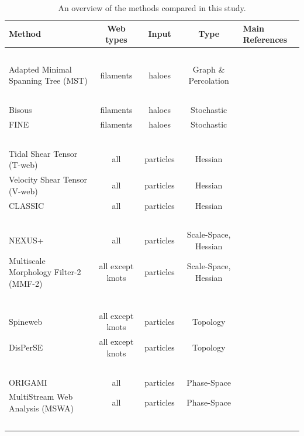 \begin{table}
 \caption{An overview of the methods compared in this study.}
 \begin{tabular}{@{}lcccl}
  \hline\hline
  Method & Web types & Input & Type & Main References \\
  \hline
\ \\
  Adapted Minimal Spanning Tree (MST) & filaments & haloes & Graph \& Percolation & \citet{Alpaslan2014} \\
\ \\
  Bisous  & filaments & haloes & Stochastic & \citet{Tempel2014} \\
  FINE  & filaments & haloes & Stochastic & \citet{Gonzalez2010} \\
\ \\
  Tidal Shear Tensor (T-web) & all & particles & Hessian & \citet{Forero-Romero2009a} \\
  Velocity Shear Tensor (V-web) & all & particles & Hessian & \citet{Hoffman2012a} \\
  CLASSIC & all & particles & Hessian & \citet{2012MNRAS.425.2443K} \\
\ \\
  NEXUS+ & all & particles & Scale-Space, Hessian & \citet{Cautun2013} \\
  Multiscale Morphology Filter-2 (MMF-2) & all except knots & particles & Scale-Space, Hessian& \citet{Aragon-Calvo2007} \\
  &&&&\citet{Aragon-Calvo2014}\\
\ \\
  Spineweb	 & all except knots & particles & Topology & \citet{Aragon-Calvo2010a} \\
  DisPerSE & all except knots & particles & Topology & \citet{Sousbie2011f} \\
\ \\
  ORIGAMI & all & particles & Phase-Space & \citet{Falck2012,Falck2015} \\
  MultiStream Web Analysis (MSWA)& all & particles & Phase-Space & \citet{Ramachandra2015} \\
\ \\
  \hline
 \end{tabular}
 \label{table:methods}
\end{table}

